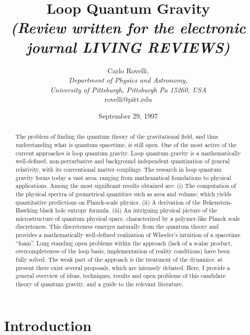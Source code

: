 \documentclass[12pt]{article}
\begin{document}
\title{Loop Quantum Gravity\\
{\em (Review written for the electronic journal LIVING REVIEWS\/)}}

\author{
 Carlo Rovelli,\\
 {\it Department of Physics and Astronomy,} \\ 
 {\it University of Pittsburgh, Pittsburgh Pa 15260, USA}\\ 
 rovelli@pitt.edu
 }
\date{September 29, 1997}

\maketitle

\begin{abstract}
The problem of finding the quantum theory of the gravitational field, 
and thus understanding what is quantum spacetime, is still open.  One 
of the most active of the current approaches is loop quantum gravity.  
Loop quantum gravity is a mathematically well-defined, 
non-perturbative and background independent quantization of general 
relativity, with its conventional matter couplings.  The research in 
loop quantum gravity forms today a vast area, ranging from 
mathematical foundations to physical applications.  Among the most 
significant results obtained are: (i) The computation of the 
physical spectra of geometrical quantities such as area and volume; 
which yields quantitative predictions on Planck-scale physics.  (ii) A 
derivation of the Bekenstein-Hawking black hole entropy formula.  
(iii) An intriguing physical picture of the microstructure of quantum 
physical space, characterized by a polymer-like Planck scale 
discreteness.  This discreteness emerges naturally from the quantum 
theory and provides a mathematically well-defined realization of 
Wheeler's intuition of a spacetime ``foam''.  Long standing open 
problems within the approach (lack of a scalar product, 
overcompleteness of the loop basis, implementation of reality 
conditions) have been fully solved.  The weak part of the approach is 
the treatment of the dynamics: at present there exist several 
proposals, which are intensely debated.  Here, I provide a general 
overview of ideas, techniques, results and open problems of this 
candidate theory of quantum gravity, and a guide to the relevant 
literature.
\end{abstract}
\newpage

\section{Introduction}
\end{document}
